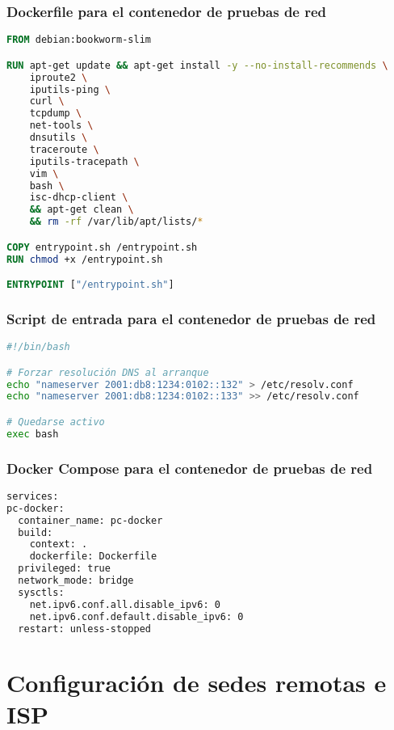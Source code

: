 \subsubsection{Dockerfile para el contenedor de pruebas de red}
\label{Apendice2:dockerfile_network_test}
\begin{lstlisting}[language=Dockerfile]
FROM debian:bookworm-slim

RUN apt-get update && apt-get install -y --no-install-recommends \
    iproute2 \
    iputils-ping \
    curl \
    tcpdump \
    net-tools \
    dnsutils \
    traceroute \
    iputils-tracepath \
    vim \
    bash \
    isc-dhcp-client \
    && apt-get clean \
    && rm -rf /var/lib/apt/lists/*

COPY entrypoint.sh /entrypoint.sh
RUN chmod +x /entrypoint.sh

ENTRYPOINT ["/entrypoint.sh"]
\end{lstlisting}

\subsubsection{Script de entrada para el contenedor de pruebas de red}
\label{Apendice2:entrypoint_network_test}
\begin{lstlisting}[language=bash]
#!/bin/bash

# Forzar resolución DNS al arranque
echo "nameserver 2001:db8:1234:0102::132" > /etc/resolv.conf
echo "nameserver 2001:db8:1234:0102::133" >> /etc/resolv.conf

# Quedarse activo
exec bash
\end{lstlisting}

\subsubsection{Docker Compose para el contenedor de pruebas de red}
\label{Apendice2:docker_compose_network_test}
\begin{lstlisting}[language=Dockerfile]
services:
pc-docker:
  container_name: pc-docker
  build:
    context: .
    dockerfile: Dockerfile
  privileged: true
  network_mode: bridge
  sysctls:
    net.ipv6.conf.all.disable_ipv6: 0
    net.ipv6.conf.default.disable_ipv6: 0
  restart: unless-stopped
\end{lstlisting}

\section{Configuración de sedes remotas e ISP}
\label{Apendice2:configuracion_sedes_remotas_isp}

